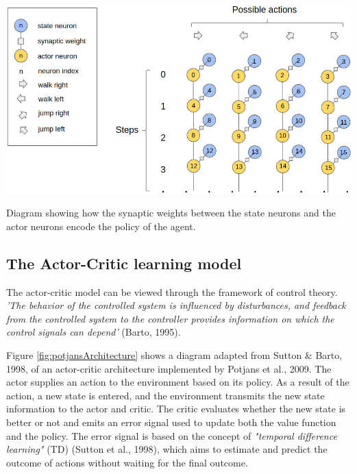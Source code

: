 \documentclass[10pt]{article}
\begin{document}
    \setcounter{suppfigure}{4}

    \begin{suppfigure*}
    \center
    \includegraphics[width=147mm]{./neuronsWideLegend.png}
    \caption{Diagram showing how the synaptic weights between the state neurons and the actor neurons encode the policy of the agent.}
    \label{fig:stateActor}
    \end{suppfigure*}

    \newpage

    \subsection{The Actor-Critic learning model}

    The actor-critic model can be viewed through the framework of control theory. \textit{'The behavior of the controlled system is influenced
    by disturbances, and feedback from the controlled system to the controller provides information on which the control signals can depend'} (Barto, 1995).

    Figure \ref{fig:potjansArchitecture} shows a diagram adapted from Sutton \& Barto, 1998, of an actor-critic architecture implemented by Potjans et al., 2009. The actor supplies an action to the environment based on its policy. As a result of the action, a new state is entered, and the environment transmits the new state information to the actor and critic. The critic evaluates whether the new state is better or not and emits an error signal used to update both the value function and the policy. The error signal is based on the concept of \textit{"temporal difference learning"} (TD) (Sutton et al., 1998), which aims to estimate and predict the outcome of actions without waiting for the final outcome.
\end{document}
